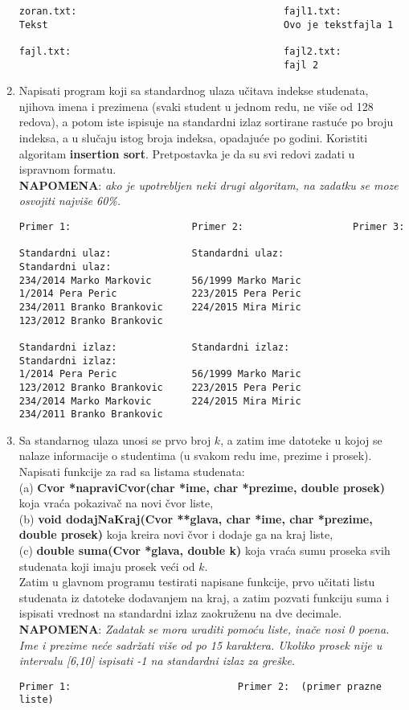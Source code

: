 \begin{enumerate}
\begin{verbatim}
zoran.txt:                                    fajl1.txt:
Tekst                                         Ovo je tekstfajla 1

fajl.txt:                                     fajl2.txt:
                                              fajl 2

\end{verbatim}
\item Napisati program koji sa standardnog ulaza učitava indekse studenata, njihova imena i prezimena (svaki student u jednom redu, ne više od 128 redova), a potom iste ispisuje na standardni izlaz sortirane rastuće po broju indeksa, a u slučaju istog broja indeksa, opadajuće po godini. Koristiti algoritam \textbf{insertion sort}. Pretpostavka je da su svi redovi zadati u ispravnom formatu.\\
\textbf{NAPOMENA}: \textit{ako je upotrebljen neki drugi algoritam, na zadatku se moze osvojiti najviše 60\%.}
\begin{verbatim}
Primer 1:                     Primer 2:                   Primer 3:                    
 
Standardni ulaz:              Standardni ulaz:            Standardni ulaz:
234/2014 Marko Markovic       56/1999 Marko Maric
1/2014 Pera Peric             223/2015 Pera Peric
234/2011 Branko Brankovic     224/2015 Mira Miric
123/2012 Branko Brankovic

Standardni izlaz:             Standardni izlaz:            Standardni izlaz:
1/2014 Pera Peric             56/1999 Marko Maric
123/2012 Branko Brankovic     223/2015 Pera Peric
234/2014 Marko Markovic       224/2015 Mira Miric
234/2011 Branko Brankovic

\end{verbatim}


\item Sa standarnog ulaza unosi se prvo broj $k$, a zatim ime datoteke u kojoj se nalaze informacije o studentima (u svakom redu ime, prezime i prosek).
Napisati funkcije za rad sa listama studenata:\\
(a) \textbf{Cvor *napraviCvor(char *ime, char *prezime, double prosek)} koja vraća pokazivač na novi čvor liste,\\
(b) \textbf{void dodajNaKraj(Cvor **glava, char *ime, char *prezime, double prosek)} koja kreira novi čvor i dodaje ga na kraj liste,\\
(c) \textbf{double suma(Cvor *glava, double k)} koja vraća sumu proseka svih studenata koji imaju prosek veći od $k$.\\
Zatim u glavnom programu testirati napisane funkcije, prvo učitati listu studenata iz datoteke dodavanjem na kraj, a zatim pozvati funkciju suma i ispisati vrednost na standardni izlaz zaokruženu na dve decimale.\\
\textbf{NAPOMENA}: \textit{Zadatak se mora uraditi pomoću liste, inače nosi 0 poena. Ime i prezime neće sadržati više od po 15 karaktera. Ukoliko prosek nije u intervalu [6,10] ispisati -1 na standardni izlaz za greške.}
\begin{verbatim}
Primer 1:                             Primer 2:  (primer prazne liste)           


\end{verbatim}
\end{enumerate}
